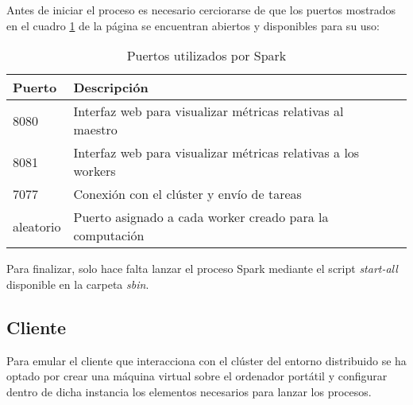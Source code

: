 Antes de iniciar el proceso es necesario cerciorarse de que los puertos mostrados en el cuadro \ref{puertos-spark} de la página \pageref{puertos-spark} se encuentran abiertos y disponibles para su uso:\\

\begin{table}[h!]
	\centering
	\begin{tabular}{|l||l|l|l|}
		
		\hline
		
		\textbf{Puerto} & \textbf{Descripción} \\
		
		\hline
		\hline
		
		8080 & Interfaz web para visualizar métricas relativas al maestro  \\
		
		\hline
		
		8081 & Interfaz web para visualizar métricas relativas a los workers \\
		
		\hline
		
		7077 & Conexión con el clúster y envío de tareas \\ 
		
		\hline
		
		aleatorio & Puerto asignado a cada worker creado para la computación \\
		
		\hline
		
	\end{tabular}
	\caption{Puertos utilizados por Spark}
	\label{puertos-spark}
\end{table}

Para finalizar, solo hace falta lanzar el proceso Spark mediante el script \textit{start-all} disponible en la carpeta \textit{sbin}.

\clearpage

\subsection{Cliente}

Para emular el cliente que interacciona con el clúster del entorno distribuido se ha optado por crear una máquina virtual sobre el ordenador portátil y configurar dentro de dicha instancia los elementos necesarios para lanzar los procesos.

